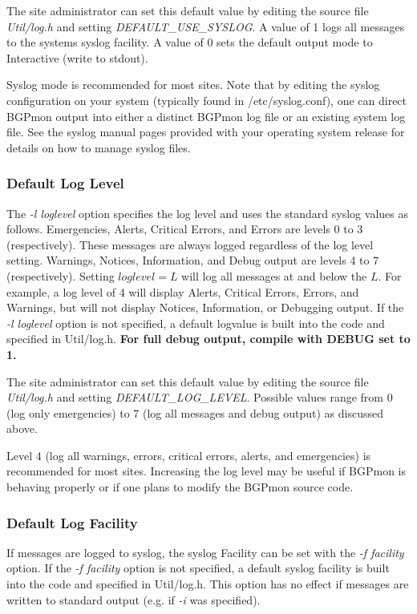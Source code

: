 The site administrator can set this default value by editing the source file \emph{Util/log.h} and setting \emph{DEFAULT\_USE\_SYSLOG}.     A value of 1 logs all messages to the systems syslog facility.   A value of 0 sets the default output mode to Interactive (write to stdout).   

Syslog mode is recommended for most sites.  Note that by editing the syslog configuration on your system (typically found in /etc/syslog.conf), one can direct BGPmon output into either a distinct BGPmon log file or an existing system log file.   See the syslog manual pages provided with your operating system release for details on how to manage syslog files.

\subsubsection{Default Log Level}

The \emph{-l loglevel} option specifies the log level and uses the standard syslog values as follows.    Emergencies, Alerts, Critical Errors, and Errors are levels 0 to 3 (respectively).    These messages are always logged regardless of the log level setting.    Warnings, Notices, Information, and Debug output are levels 4 to 7 (respectively).   Setting $loglevel = L$ will log all messages at and below the $L$.   For example, a log level of 4 will display Alerts, Critical Errors, Errors, and Warnings, but will not display Notices, Information, or Debugging output.     If the \emph{-l loglevel} option is not specified,  a default logvalue is built into the code and specified in Util/log.h.   {\bf For full debug output,   compile with DEBUG set to 1.}

The site administrator can set this default value by editing the source file \emph{Util/log.h} and setting \emph{DEFAULT\_LOG\_LEVEL}.     Possible values range from 0 (log only emergencies) to 7 (log all messages and debug output) as discussed above.    

Level 4 (log all warnings, errors, critical errors, alerts, and emergencies) is recommended for most sites.  Increasing the log level may be useful if BGPmon is behaving properly or if one plans to modify the BGPmon source code.
 
\subsubsection{Default Log Facility}
  
If messages are logged to syslog, the syslog Facility can be set with the \emph{-f facility} option.    If the \emph{-f facility} option is not specified,  a default syslog facility is built into the code and specified in Util/log.h.     This option has no effect if messages are written to standard output (e.g. if \emph{-i} was specified).    

